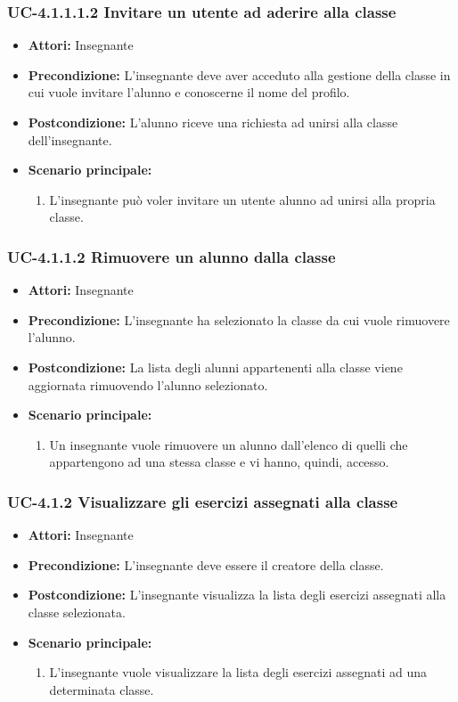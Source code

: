 \subsubsection{UC-4.1.1.1.2 Invitare un utente ad aderire alla classe}
\begin{itemize}
		\item \textbf{Attori: } Insegnante
		\item \textbf{Precondizione: }  L'insegnante deve aver acceduto alla gestione della classe in cui vuole invitare l'alunno e conoscerne il nome del profilo. 
		\item \textbf{Postcondizione: } L'alunno riceve una richiesta ad unirsi alla classe dell'insegnante.
		\item \textbf{Scenario principale: } 
		\begin{enumerate}
			\item L'insegnante può voler invitare un utente alunno ad unirsi alla propria classe.
		\end{enumerate} 
	\end{itemize}
\subsubsection{UC-4.1.1.2 Rimuovere un alunno dalla classe}
\begin{itemize}
		\item \textbf{Attori: } Insegnante
		\item \textbf{Precondizione: }  L'insegnante ha selezionato la classe da cui vuole rimuovere l'alunno.
		\item \textbf{Postcondizione: } La lista degli alunni appartenenti alla classe viene aggiornata rimuovendo l'alunno selezionato.
		\item \textbf{Scenario principale: } 
		\begin{enumerate}
			\item Un insegnante vuole rimuovere un alunno dall'elenco di quelli che appartengono ad una stessa classe e vi hanno, quindi, accesso.
		\end{enumerate}
	\end{itemize}
\subsubsection{UC-4.1.2 Visualizzare gli esercizi assegnati alla classe}
\begin{itemize}
		\item \textbf{Attori: } Insegnante
		\item \textbf{Precondizione: }  L'insegnante deve essere il creatore della classe.
		\item \textbf{Postcondizione: } L'insegnante visualizza la lista degli esercizi assegnati alla classe selezionata.
		\item \textbf{Scenario principale: } 
		\begin{enumerate}
			\item L'insegnante vuole visualizzare la lista degli esercizi assegnati ad una determinata classe. 
		\end{enumerate}
	\end{itemize}
